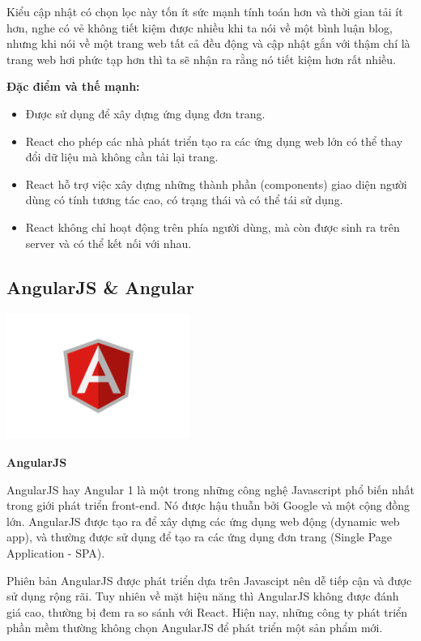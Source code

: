 Kiểu cập nhật có chọn lọc này tốn ít sức mạnh tính toán hơn và thời gian tải ít hơn, nghe có vẻ không tiết kiệm được nhiều khi ta nói về một bình luận blog, nhưng khi nói về một trang web tất cả đều động và cập nhật gắn với thậm chí là trang web hơi phức tạp hơn thì ta sẽ nhận ra rằng nó tiết kiệm hơn rất nhiều.

\textbf{Đặc điểm và thế mạnh:}
\begin {itemize}
\item Được sử dụng để xây dựng ứng dụng đơn trang.
\item React cho phép các nhà phát triển tạo ra các ứng dụng web lớn có thể thay đổi dữ liệu mà không cần tải lại trang.
\item React hỗ trợ việc xây dựng những thành phần (components) giao diện người dùng có tính tương tác cao, có trạng thái và có thể tái sử dụng.
\item React không chỉ hoạt động trên phía người dùng, mà còn được sinh ra trên server và có thể kết nối với nhau.
\end {itemize}

\subsection{AngularJS \& Angular}
\begin{center}
  \captionsetup{type=figure}
  \includegraphics[width=6cm]{img/angular-logo.png}
\end{center}
\newpage
\textbf{AngularJS}

AngularJS hay Angular 1 là một trong những công nghệ Javascript phổ biến nhất trong giới phát triển front-end. Nó được hậu thuẫn bởi Google và một cộng đồng lớn. AngularJS được tạo ra để xây dựng các ứng dụng web động (dynamic web app), và thường được sử dụng để tạo ra các ứng dụng đơn trang (Single Page Application - SPA).

Phiên bản AngularJS được phát triển dựa trên Javascipt nên dễ tiếp cận và được sử dụng rộng rãi. Tuy nhiên về mặt hiệu năng thì AngularJS không được đánh giá cao, thường bị đem ra so sánh với React. Hiện nay, những công ty phát triển phần mềm thường không chọn AngularJS để phát triển một sản phẩm mới.

